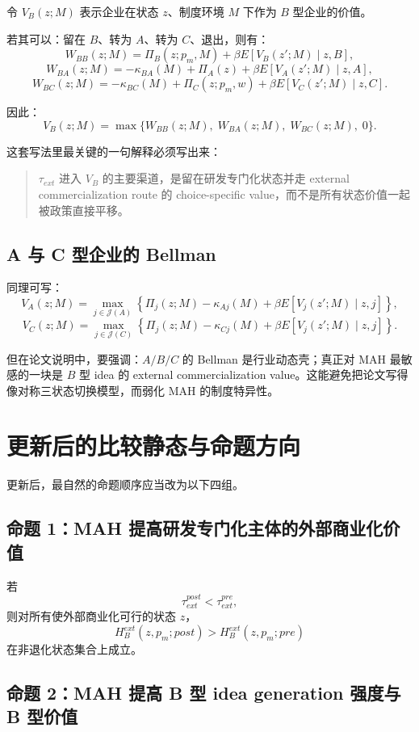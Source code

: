 \documentclass[12pt,fontset=none]{ctexart}
\begin{document}
令 $V_B(z;M)$ 表示企业在状态 $z$、制度环境 $M$ 下作为 $B$ 型企业的价值。

若其可以：留在 $B$、转为 $A$、转为 $C$、退出，则有：
\[
W_{BB}(z;M)=\Pi_B(z;p_m,M)+\beta E[V_B(z';M)\mid z,B],
\]
\[
W_{BA}(z;M)= -\kappa_{BA}(M)+\Pi_A(z)+\beta E[V_A(z';M)\mid z,A],
\]
\[
W_{BC}(z;M)= -\kappa_{BC}(M)+\Pi_C(z;p_m,w)+\beta E[V_C(z';M)\mid z,C].
\]

因此：
\[
V_B(z;M)=\max\{W_{BB}(z;M),\;W_{BA}(z;M),\;W_{BC}(z;M),\;0\}.
\]

这套写法里最关键的一句解释必须写出来：

\begin{quote}
$\tau_{ext}$ 进入 $V_B$ 的主要渠道，是留在研发专门化状态并走 external commercialization route 的 choice-specific value，而不是所有状态价值一起被政策直接平移。
\end{quote}

\subsection{A 与 C 型企业的 Bellman}

同理可写：
\[
V_A(z;M)=\max_{j\in\mathcal J(A)}\left\{\Pi_j(z;M)-\kappa_{Aj}(M)+\beta E[V_j(z';M)\mid z,j]\right\},
\]
\[
V_C(z;M)=\max_{j\in\mathcal J(C)}\left\{\Pi_j(z;M)-\kappa_{Cj}(M)+\beta E[V_j(z';M)\mid z,j]\right\}.
\]

但在论文说明中，要强调：$A/B/C$ 的 Bellman 是行业动态壳；真正对 MAH 最敏感的一块是 $B$ 型 idea 的 external commercialization value。这能避免把论文写得像对称三状态切换模型，而弱化 MAH 的制度特异性。

\section{更新后的比较静态与命题方向}

更新后，最自然的命题顺序应当改为以下四组。

\subsection{命题 1：MAH 提高研发专门化主体的外部商业化价值}

若
\[
\tau_{ext}^{post}<\tau_{ext}^{pre},
\]
则对所有使外部商业化可行的状态 $z$，
\[
H_B^{ext}(z,p_m;post) > H_B^{ext}(z,p_m;pre)
\]
在非退化状态集合上成立。

\subsection{命题 2：MAH 提高 B 型 idea generation 强度与 B 型价值}
\end{document}
